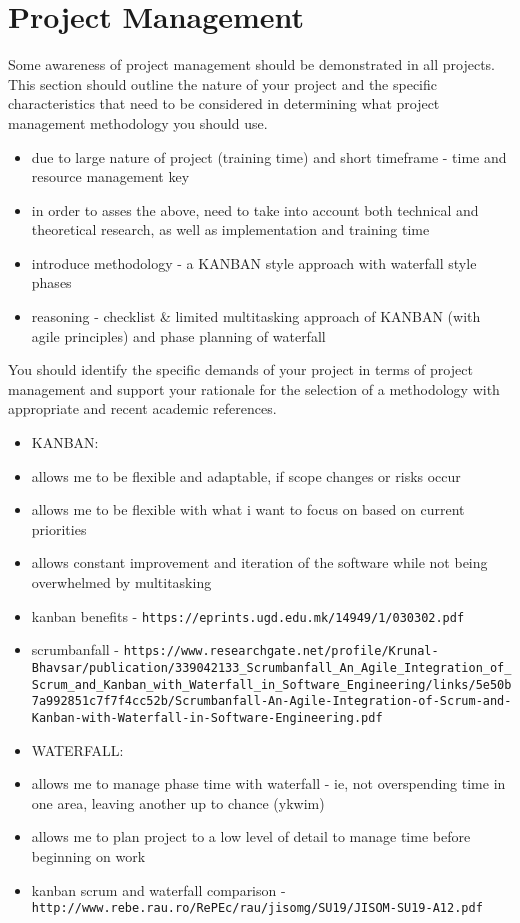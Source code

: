 \section{Project Management}
Some awareness of project management should be demonstrated in all projects. This section should outline the nature of your project and the specific characteristics that need to be considered in determining  what project management methodology you should use. 
\begin{itemize}
\item due to large nature of project (training time) and short timeframe - time and resource management key
\item in order to asses the above, need to take into account both technical and theoretical research, as well as implementation and training time
\item introduce methodology - a KANBAN style approach with waterfall style phases
\item reasoning - checklist & limited multitasking approach of KANBAN (with agile principles) and phase planning of waterfall
\end{itemize}


You should identify the specific demands of your project in terms of project management and support your rationale for the selection of a methodology with appropriate and recent academic references. 
\begin{itemize}
\item KANBAN:
\item allows me to be flexible and adaptable, if scope changes or risks occur
\item allows me to be flexible with what i want to focus on based on current priorities
\item allows constant improvement and iteration of the software while not being overwhelmed by multitasking
\item kanban benefits - \nolinkurl{https://eprints.ugd.edu.mk/14949/1/030302.pdf}
\item scrumbanfall - \nolinkurl{https://www.researchgate.net/profile/Krunal-Bhavsar/publication/339042133_Scrumbanfall_An_Agile_Integration_of_Scrum_and_Kanban_with_Waterfall_in_Software_Engineering/links/5e50b7a992851c7f7f4cc52b/Scrumbanfall-An-Agile-Integration-of-Scrum-and-Kanban-with-Waterfall-in-Software-Engineering.pdf}
\item WATERFALL:
\item allows me to manage phase time with waterfall - ie, not overspending time in one area, leaving another up to chance (ykwim)
\item allows me to plan project to a low level of detail to manage time before beginning on work
\item kanban scrum and waterfall comparison - \nolinkurl{http://www.rebe.rau.ro/RePEc/rau/jisomg/SU19/JISOM-SU19-A12.pdf}
\end{itemize}



